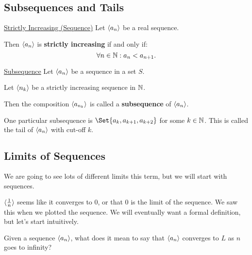 \subsection{Subsequences and Tails}
\begin{Definition}{\href{https://proofwiki.org/wiki/Definition:Strictly_Increasing/Sequence}{Strictly Increasing (Sequence)}}{}
    Let $ \langle a_n\rangle $ be a real sequence.\bigskip

    Then $ \langle a_n\rangle $ is \textbf{strictly increasing} if and only if:
    \[ \forall n\in\mathbb{N}:a_n<a_{n+1}. \]
\end{Definition}
\begin{Definition}{\href{https://proofwiki.org/wiki/Definition:Subsequence}{Subsequence}}{}
    Let $ \langle a_n\rangle $ be a sequence in a set $ S $.\smallskip

    Let $ \langle n_k\rangle $ be a strictly increasing sequence in $ \mathbb{N} $.\bigskip

    Then the composition $ \langle a_{n_k}\rangle $ is called a \textbf{subsequence} of $ \langle a_n\rangle $.
\end{Definition}
One particular subsequence is $ \Set{a_k,a_{k+1},a_{k+2}} $ for some $ k\in\mathbb{N} $.
This is called the tail of $ \langle a_n\rangle $ with cut-off $ k $.

\subsection{Limits of Sequences}
We are going to see lots of different limits this term, but we will start with sequences.
\begin{Example}{}{}
    $ \langle\frac{1}{n}\rangle $ seems like it converges to $ 0 $, or that $ 0 $ is the limit of the sequence.
    We saw this when we plotted the sequence. We will eventually want a formal definition, but let's start intuitively.
\end{Example}
Given a sequence $ \langle a_n\rangle $, what does it mean to say that $ \langle a_n\rangle $ converges to $ L $
as $ n $ goes to infinity?

